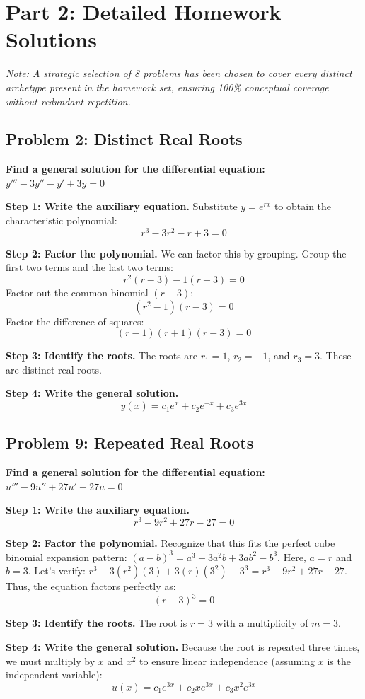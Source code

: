 \documentclass[11pt]{article}
\begin{document}
\newpage
\section{Part 2: Detailed Homework Solutions}
\textit{Note: A strategic selection of 8 problems has been chosen to cover every distinct archetype present in the homework set, ensuring 100\% conceptual coverage without redundant repetition.}

\subsection{Problem 2: Distinct Real Roots}
\textbf{Find a general solution for the differential equation:} $y''' - 3y'' - y' + 3y = 0$

\textbf{Step 1: Write the auxiliary equation.}
Substitute $y = e^{rx}$ to obtain the characteristic polynomial:
\[ r^3 - 3r^2 - r + 3 = 0 \]

\textbf{Step 2: Factor the polynomial.}
We can factor this by grouping. Group the first two terms and the last two terms:
\[ r^2(r - 3) - 1(r - 3) = 0 \]
Factor out the common binomial $(r - 3)$:
\[ (r^2 - 1)(r - 3) = 0 \]
Factor the difference of squares:
\[ (r - 1)(r + 1)(r - 3) = 0 \]

\textbf{Step 3: Identify the roots.}
The roots are $r_1 = 1$, $r_2 = -1$, and $r_3 = 3$. These are distinct real roots.

\textbf{Step 4: Write the general solution.}
\[ y(x) = c_1 e^x + c_2 e^{-x} + c_3 e^{3x} \]

\subsection{Problem 9: Repeated Real Roots}
\textbf{Find a general solution for the differential equation:} $u''' - 9u'' + 27u' - 27u = 0$

\textbf{Step 1: Write the auxiliary equation.}
\[ r^3 - 9r^2 + 27r - 27 = 0 \]

\textbf{Step 2: Factor the polynomial.}
Recognize that this fits the perfect cube binomial expansion pattern: $(a - b)^3 = a^3 - 3a^2b + 3ab^2 - b^3$.
Here, $a = r$ and $b = 3$. Let's verify:
$r^3 - 3(r^2)(3) + 3(r)(3^2) - 3^3 = r^3 - 9r^2 + 27r - 27$.
Thus, the equation factors perfectly as:
\[ (r - 3)^3 = 0 \]

\textbf{Step 3: Identify the roots.}
The root is $r = 3$ with a multiplicity of $m = 3$.

\textbf{Step 4: Write the general solution.}
Because the root is repeated three times, we must multiply by $x$ and $x^2$ to ensure linear independence (assuming $x$ is the independent variable):
\[ u(x) = c_1 e^{3x} + c_2 x e^{3x} + c_3 x^2 e^{3x} \]
\end{document}
